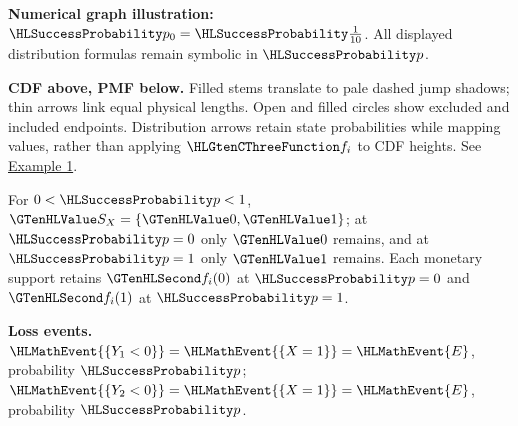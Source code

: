 {\begin{center}
\end{center}
\textbf{Numerical graph illustration:} $\SuccessProb{p_0}=\SuccessProb{\frac{1}{10}}$. All displayed distribution formulas remain symbolic in $\SuccessProb{p}$.
\par\textbf{CDF above, PMF below.} Filled stems translate to pale dashed jump shadows; thin arrows link equal physical lengths. Open and filled circles show excluded and included endpoints. Distribution arrows retain state probabilities while mapping values, rather than applying $\TransformationFunction{f_i}$ to CDF heights. See \hyperref[ex:intro-one]{Example 1}.\par
For $0<\SuccessProb{p}<1$, $\Indicator{S_X}=\{\Indicator{0},\Indicator{1}\}$; at $\SuccessProb{p}=0$ only $\Indicator{0}$ remains, and at $\SuccessProb{p}=1$ only $\Indicator{1}$ remains. Each monetary support retains $\Money{f_i(0)}$ at $\SuccessProb{p}=0$ and $\Money{f_i(1)}$ at $\SuccessProb{p}=1$.
\par\textbf{Loss events.} $\HLMathEvent{\{Y_1<0\}}=\HLMathEvent{\{X=1\}}=\HLMathEvent{E}$, probability $\SuccessProb{p}$; $\HLMathEvent{\{Y_2<0\}}=\HLMathEvent{\{X=1\}}=\HLMathEvent{E}$, probability $\SuccessProb{p}$.
\endgroup
}
